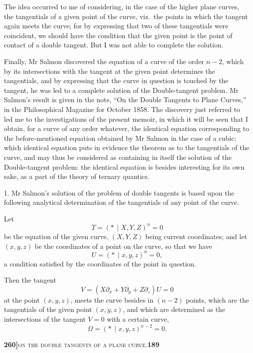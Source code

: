 \documentclass[11pt]{article}
\newcommand{\Cdel}{\mid}
\begin{document}
The idea occurred to me of considering, in the case of the higher plane curves, the tangentials of a given point of the curve, viz.\ the points in which the tangent again meets the curve; for by expressing that two of these tangentials were coincident, we should have the condition that the given point is the point of contact of a double tangent. But I was not able to complete the solution.

Finally, Mr Salmon discovered the equation of a curve of the order $n - 2$, which by its intersections with the tangent at the given point determines the tangentials, and by expressing that the curve in question is touched by the tangent, he was led to a complete solution of the Double-tangent problem. Mr Salmon's result is given in the note, ``On the Double Tangents to Plane Curves,'' in the Philosophical Magazine for October 1858. The discovery just referred to led me to the investigations of the present memoir, in which it will be seen that I obtain, for a curve of any order whatever, the identical equation corresponding to the before-mentioned equation obtained by Mr Salmon in the case of a cubic; which identical equation puts in evidence the theorem as to the tangentials of the curve, and may thus be considered as containing in itself the solution of the Double-tangent problem: the identical equation is besides interesting for its own sake, as a part of the theory of ternary quantics.

\medskip

1. Mr Salmon's solution of the problem of double tangents is based upon the following analytical determination of the tangentials of any point of the curve.

Let
\[
T = (*\,\Cdel X, Y, Z)^n = 0
\]
be the equation of the given curve, $(X, Y, Z)$ being current coordinates; and let $(x, y, z)$ be the coordinates of a point on the curve, so that we have
\[
U = (*\,\Cdel x, y, z)^n = 0,
\]
a condition satisfied by the coordinates of the point in question.

Then the tangent
\[
V = (X\partial_x + Y\partial_y + Z\partial_z)U = 0
\]
at the point $(x, y, z)$, meets the curve besides in $(n-2)$ points, which are the tangentials of the given point $(x, y, z)$, and which are determined as the intersections of the tangent $V = 0$ with a certain curve,
\[
\Omega = (*\,\Cdel x, y, z)^{n-2} = 0.
\]

\newpage

\noindent\textbf{260]}\hfill\textsc{on the double tangents of a plane curve.}\hfill\textbf{189}
\end{document}
